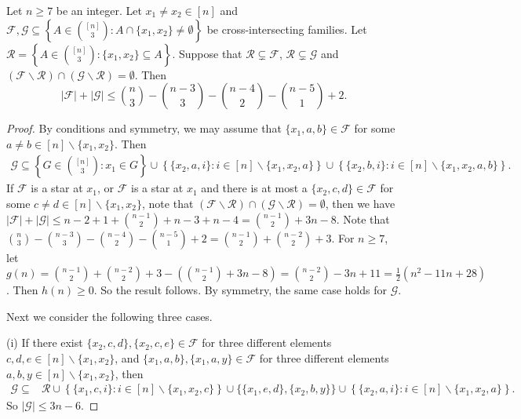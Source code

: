 \documentclass[10pt,a4paper]{amsart}
\begin{document}
\begin{lemma}\label{Lem52}
 Let $n \geq 7$ be an integer.  Let $x_1\neq x_2\in [n]$ and $\mathcal{F}, \mathcal{G} \subseteq\left\{A \in\binom{[n]}{3}:  A\cap \{x_1, x_2\}\neq \emptyset\right\}$ be cross-intersecting families. Let $
\mathcal{R}=\left\{A \in\binom{[n]}{3}: \{x_1,x_2\} \subseteq A \right\}$.
Suppose that $\mathcal{R}\subsetneq \mathcal{F}$, $\mathcal{R}\subsetneq \mathcal{G}$ and $(\mathcal{F}\backslash\mathcal{R}) \cap(\mathcal{G}\backslash\mathcal{R}) =\emptyset$.
Then
$$
|\mathcal{F}|+|\mathcal{G}| \leq\binom{n}{3}-\binom{n-3}{3}-\binom{n-4}{2}-\binom{n-5}{1}+2.
$$
\end{lemma}

\begin{proof}
By conditions and symmetry, we may assume that $\{x_1, a, b\}\in \mathcal{F}$ for some
$a\neq b\in [n]\backslash \{x_1, x_2\}$. Then
\begin{align*}
\mathcal{G}\subseteq\left\{G \in\binom{[n]}{3}: x_1\in G\right\}\cup\left\{\{x_2,a, i\}:  i\in [n]\backslash\{x_1,x_2,a\}\right\}\cup\left\{\{x_2,b, i\}:  i\in [n]\backslash\{x_1,x_2,a, b\}\right\}.
\end{align*}
If $\mathcal{F}$ is a star at $x_1$, or $\mathcal{F}$ is a star at $x_1$ and there is at most a $\{x_2, c, d\}\in \mathcal{F}$ for some
$c\neq d\in [n]\backslash \{x_1, x_2\}$, note that $(\mathcal{F}\backslash\mathcal{R}) \cap(\mathcal{G}\backslash\mathcal{R}) =\emptyset$, then we have
$
|\mathcal{F}|+|\mathcal{G}|\leq n-2+1+ \binom{n-1}{2}+n-3+n-4
=\binom{n-1}{2}+3n-8
$.
Note that $\binom{n}{3}-\binom{n-3}{3}-\binom{n-4}{2}-\binom{n-5}{1}+2=\binom{n-1}{2}+\binom{n-2}{2}+3$.
For $n\geq 7$, let
$
g(n)=\binom{n-1}{2}+\binom{n-2}{2}+3-\left(\binom{n-1}{2}+3n-8\right)
=\binom{n-2}{2}-3n+11=\frac{1}{2}\left(n^2-11n+28 \right)
$.
Then $h(n)\geq 0$. So the result follows. By symmetry, the same case holds for $\mathcal{G}$.

Next we consider the following three cases.

(i) If there exist $\{x_2, c, d\}, \{x_2, c, e\}\in \mathcal{F}$ for three different elements $c, d, e\in [n]\backslash \{x_1, x_2\}$, and $\{x_1, a, b\}, \{x_1, a, y\}\in \mathcal{F}$ for three different elements $a, b, y\in [n]\backslash \{x_1, x_2\}$, then
\begin{align*}
\mathcal{G}\subseteq&\mathcal{R}\cup\left\{\{x_1,c, i\}:  i\in [n]\backslash\{x_1,x_2,c\}\right\}\cup\{\{x_1,e, d\}, \{x_2,b, y\}\}\cup\left\{\{x_2,a, i\}:  i\in [n]\backslash\{x_1,x_2,a\}\right\}.
\end{align*}
So $|\mathcal{G}|\leq 3n-6$.


\end{proof}
\end{document}
